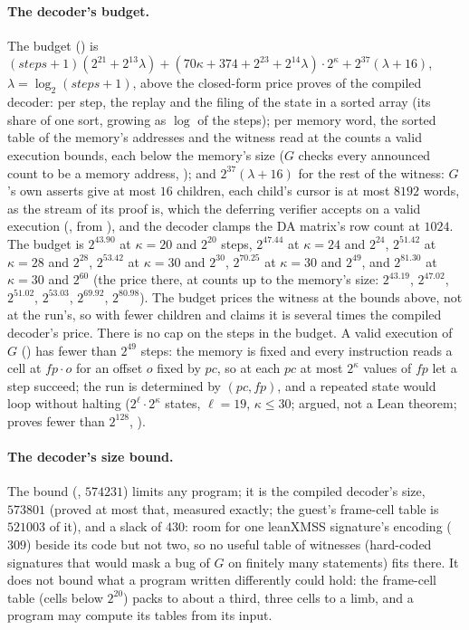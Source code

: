 \documentclass[11pt]{article}
\begin{document}
\paragraph{The decoder's budget.} The budget () is
$(\mathit{steps} + 1)(2^{21} + 2^{13}\lambda) + (70\kappa + 374 + 2^{23} + 2^{14}\lambda)\cdot 2^\kappa + 2^{37}(\lambda + 16)$,
$\lambda = \log_2(\mathit{steps} + 1)$, above the closed-form price  proves of the
compiled decoder: per step, the replay and the filing of the state in a sorted array (its share of
one sort, growing as $\log$ of the steps); per memory word, the sorted table of the memory's
addresses and the witness read at the counts a valid execution bounds, each below the memory's
size ($G$ checks every announced count to be a memory address, ); and
$2^{37}(\lambda + 16)$ for the rest of the witness: $G$'s own asserts give at most $16$ children,
each child's cursor is at most $8192$ words, as the stream of its proof is, which the deferring
verifier accepts on a valid execution (, from
), and the decoder clamps the DA matrix's row count at $1024$. The
budget is $2^{43.90}$ at $\kappa = 20$ and $2^{20}$ steps, $2^{47.44}$ at $\kappa = 24$ and
$2^{24}$, $2^{51.42}$ at $\kappa = 28$ and $2^{28}$, $2^{53.42}$ at $\kappa = 30$ and $2^{30}$,
$2^{70.25}$ at $\kappa = 30$ and $2^{49}$, and $2^{81.30}$ at $\kappa = 30$ and $2^{60}$ (the price
there, at counts up to the memory's size: $2^{43.19}$, $2^{47.02}$, $2^{51.02}$, $2^{53.03}$,
$2^{69.92}$, $2^{80.98}$). The budget prices the witness at the bounds above, not at the run's, so
with fewer children and claims it is several times the compiled decoder's price. There is no cap on the steps in the budget. A valid execution of $G$ ()
has fewer than $2^{49}$ steps: the memory is fixed and every instruction reads a cell at
$\mathit{fp}\cdot o$ for an offset $o$ fixed by $\mathit{pc}$, so at each $\mathit{pc}$ at most
$2^\kappa$ values of $\mathit{fp}$ let a step succeed; the run is determined by
$(\mathit{pc}, \mathit{fp})$, and a repeated state would loop without halting
($2^\ell\cdot 2^\kappa$ states, $\ell = 19$, $\kappa \le 30$; argued, not a Lean theorem;
 proves fewer than $2^{128}$, ).

\paragraph{The decoder's size bound.} The bound (, $574231$)
limits any program; it is the compiled decoder's size, $573801$ (proved
at most that, measured exactly; the guest's frame-cell table is $521003$ of it), and a slack of
$430$: room for one leanXMSS signature's encoding ($309$) beside its code but not two, so no useful
table of witnesses (hard-coded signatures that would mask a bug of $G$ on finitely many statements)
fits there. It does not bound what a program written differently could hold: the frame-cell table
(cells below $2^{20}$) packs to about a third, three cells to a limb, and a program may compute its
tables from its input.
\end{document}
